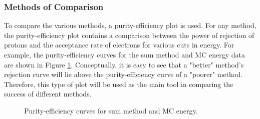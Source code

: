 \subsubsection{Methods of Comparison}
To compare the various methods, a purity-efficiency plot is used. For any method, the purity-efficiency plot contains a comparison between the power of rejection of protons and the acceptance rate of electrons for various cuts in energy. For example, the purity-efficiency curves for the sum method and MC energy data are shown in Figure \ref{rejectionPlotSumAndMCenergy}. Conceptually, it is easy to see that a "better" method's rejection curve will lie above the purity-efficiency curve of a "poorer" method. Therefore, this type of plot will be used as the main tool in comparing the success of different methods. %

\begin{figure}[ht!]
    \centering
    \caption{Purity-efficiency curves for sum method and MC energy.}
    \label{rejectionPlotSumAndMCenergy}
\end{figure} 





